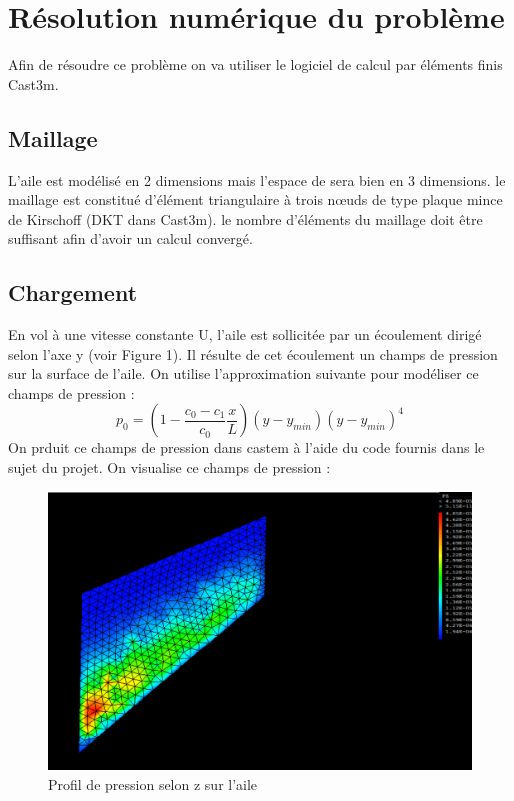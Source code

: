 \documentclass[12pt,a4paper]{article}
\begin{document}
\section{Résolution numérique du problème}
Afin de résoudre ce problème on va utiliser le logiciel de calcul par éléments finis Cast3m.
\subsection{Maillage}
L'aile est modélisé en 2 dimensions mais l'espace de sera bien en 3 dimensions. le maillage est constitué d'élément triangulaire à trois nœuds de type plaque mince de Kirschoff (DKT dans Cast3m). le nombre d'éléments du maillage doit être suffisant afin d'avoir un calcul convergé.
\subsection{Chargement}
En vol à une vitesse constante U, l’aile est sollicitée par un écoulement dirigé selon l’axe y (voir Figure 1). Il résulte de cet écoulement un champs de pression sur la surface de l'aile. On utilise l'approximation suivante pour modéliser ce champs de pression :
\begin{equation}
p_0=\left(1-\frac{c_0-c_1}{c_0}\frac{x}{L}\right)(y-y_{min})(y-y_{min})^4
\end{equation}
On prduit ce champs de pression dans castem à l'aide du code fournis dans le sujet du projet. On visualise ce champs de pression :
\begin{figure}[h]
\includegraphics[scale=0.5]{images/champspression.png}\centering
\caption{Profil de pression selon z sur l'aile}
\end{figure}
\end{document}
